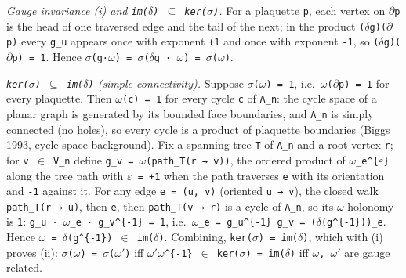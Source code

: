 \documentclass[
  american,
  11pt,
  letterpaper,
]{article}
\begin{document}
\emph{Gauge invariance (i) and \texttt{im(\ensuremath{\delta})\ \ensuremath{\subseteq}\ ker(\ensuremath{\sigma})}.} For a plaquette \texttt{p}, each vertex on \texttt{\ensuremath{\partial}p} is the head of one traversed edge and the tail of the next; in the product \texttt{(\ensuremath{\delta}g)(\ensuremath{\partial}p)} every \texttt{g\_u} appears once with exponent \texttt{+1} and once with exponent \texttt{-1}, so \texttt{(\ensuremath{\delta}g)(\ensuremath{\partial}p)\ =\ 1}. Hence \texttt{\ensuremath{\sigma}(g·\ensuremath{\omega})\ =\ \ensuremath{\sigma}(\ensuremath{\delta}g\ ·\ \ensuremath{\omega})\ =\ \ensuremath{\sigma}(\ensuremath{\omega})}.

\emph{\texttt{ker(\ensuremath{\sigma})\ \ensuremath{\subseteq}\ im(\ensuremath{\delta})} (simple connectivity).} Suppose \texttt{\ensuremath{\sigma}(\ensuremath{\omega})\ =\ 1}, i.e.~\texttt{\ensuremath{\omega}(\ensuremath{\partial}p)\ =\ 1} for every plaquette. Then \texttt{\ensuremath{\omega}(c)\ =\ 1} for every cycle \texttt{c} of \texttt{Λ\_n}: the cycle space of a planar graph is generated by its bounded face boundaries, and \texttt{Λ\_n} is simply connected (no holes), so every cycle is a product of plaquette boundaries (Biggs 1993, cycle-space background). Fix a spanning tree \texttt{T} of \texttt{Λ\_n} and a root vertex \texttt{r}; for \texttt{v\ \ensuremath{\in}\ V\_n} define \texttt{g\_v\ =\ \ensuremath{\omega}(path\_T(r\ →\ v))}, the ordered product of \texttt{\ensuremath{\omega}\_e\^{}\{\ensuremath{\varepsilon}\}} along the tree path with \texttt{\ensuremath{\varepsilon}\ =\ +1} when the path traverses \texttt{e} with its orientation and \texttt{-1} against it. For any edge \texttt{e\ =\ (u,\ v)} (oriented \texttt{u\ →\ v}), the closed walk \texttt{path\_T(r\ →\ u)}, then \texttt{e}, then \texttt{path\_T(v\ →\ r)} is a cycle of \texttt{Λ\_n}, so its \texttt{\ensuremath{\omega}}-holonomy is \texttt{1}: \texttt{g\_u\ ·\ \ensuremath{\omega}\_e\ ·\ g\_v\^{}\{-1\}\ =\ 1}, i.e.~\texttt{\ensuremath{\omega}\_e\ =\ g\_u\^{}\{-1\}\ g\_v\ =\ (\ensuremath{\delta}(g\^{}\{-1\}))\_e}. Hence \texttt{\ensuremath{\omega}\ =\ \ensuremath{\delta}(g\^{}\{-1\})\ \ensuremath{\in}\ im(\ensuremath{\delta})}. Combining, \texttt{ker(\ensuremath{\sigma})\ =\ im(\ensuremath{\delta})}, which with (i) proves (ii): \texttt{\ensuremath{\sigma}(\ensuremath{\omega})\ =\ \ensuremath{\sigma}(\ensuremath{\omega}\ensuremath{'})} iff \texttt{\ensuremath{\omega}\ensuremath{'}\ensuremath{\omega}\^{}\{-1\}\ \ensuremath{\in}\ ker(\ensuremath{\sigma})\ =\ im(\ensuremath{\delta})} iff \texttt{\ensuremath{\omega},\ \ensuremath{\omega}\ensuremath{'}} are gauge related.
\end{document}

